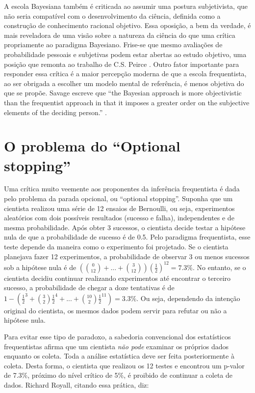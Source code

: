 A escola Bayesiana também é criticada ao assumir uma postura subjetivista, que não seria compatível com o desenvolvimento
da ciência, definida como a construção de conhecimento racional objetivo. Essa oposição, a bem da verdade, é mais reveladora
de uma visão sobre a natureza da ciência do que uma crítica propriamente ao paradigma Bayesiano. Frise-se que mesmo 
avaliações de probabilidade pessoais e subjetivas podem estar abertas ao estudo objetivo, uma posição que remonta ao trabalho
de C.S. Peirce \citep{Stigler78}.  Outro fator importante para responder essa crítica é a maior percepção moderna
de que a escola frequentista, ao ser obrigada a escolher um modelo mental de referência, é menos objetiva do que se propõe.
Savage escreve que ``the Bayesian approach is more objectivistic than the frequentist approach in that it imposes a greater
order on the subjective elements of the deciding person.'' \citep{Savage60}.

\section {O problema do ``Optional stopping''}

Uma crítica muito veemente aos proponentes da inferência frequentista é dada pelo problema da parada opcional, ou 
``optional stopping''. Suponha que um cientista realizou uma série de 12 ensaios de Bernoulli, ou seja, experimentos aleatórios
com dois possíveis resultados (sucesso e falha), independentes e de mesma probabilidade. Após obter 3 sucessos, o cientista
decide testar a hipótese nula de que a probabilidade de sucesso é de 0.5. Pelo paradigma frequentista, esse teste depende
da maneira como o experimento foi projetado. Se o cientista planejava fazer 12 experimentos, a probabilidade de observar 3
ou menos sucessos sob a hipótese nula é de $ \left( {0 \choose 12} + ... + {3 \choose 12}\right) (\frac{1}{2})^{12} = 7.3\%$. 
No entanto, se o cientista decidiu continuar realizando experimentos até
encontrar o terceiro sucesso, a probabilidade de chegar a doze tentativas é de 
$1 - \left( \frac{1}{2}^3 + {3 \choose 2} \frac{1}{2}^4 + ... + {10 \choose 2} \frac{1}{2}^{11}\right) = 3.3\%$. Ou seja,
dependendo da intenção original do cientista, os mesmos dados podem servir para refutar ou não a hipótese nula.

Para evitar esse tipo de  paradoxo, a sabedoria convencional dos estatísticos frequentistas afirma que um cientista {\em não pode}
examinar os próprios dados enquanto os coleta. Toda a análise estatística deve ser feita posteriormente à coleta. 
Desta forma, o cientista que realizou os 12 testes e encontrou um p-valor de 7.3\%, próximo do nível crítico de 5\%, é
proibido de continuar a coleta de dados. Richard Royall, citando essa prática, diz:

